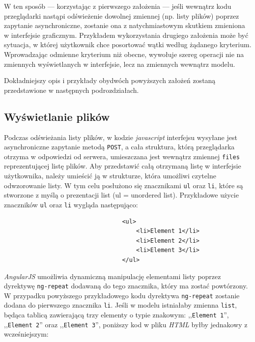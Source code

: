 \documentclass[polish,a4paper,twoside]{ppfcmthesis}
\begin{document}
W ten sposób --- korzystając z pierwszego założenia --- jeśli wewnątrz kodu przeglądarki nastąpi odświeżenie dowolnej zmiennej (np. listy plików) poprzez zapytanie asynchroniczne, zostanie ona z natychmiastowym skutkiem zmieniona w interfejsie graficznym. Przykładem wykorzystania drugiego założenia może być sytuacja, w której użytkownik chce posortować wątki według żądanego kryterium. Wprowadzając odmienne kryterium niż obecne, wywołuje szereg operacji nie na zmiennych wyświetlanych w interfejsie, lecz na zmiennych wewnątrz modelu.

Dokładniejszy opis i przykłady obydwóch powyższych założeń zostaną przedstawione w następnych podrozdziałach.

\subsection{Wyświetlanie plików}

Podczas odświeżania listy plików, w kodzie \emph{javascript} interfejsu wysyłane jest asynchroniczne zapytanie metodą \texttt{POST}, a cała struktura, którą przeglądarka otrzyma w odpowiedzi od serwera, umieszczana jest wewnątrz zmiennej \texttt{files} reprezentującej listę plików. Aby przedstawić całą otrzymaną listę w interfejsie użytkownika, należy umieścić ją w strukturze, która umożliwi czytelne odwzorowanie listy. W tym celu posłużono się znacznikami \texttt{ul} oraz \texttt{li}, które są stworzone z myślą o prezentacji list (ul = unordered list). Przykładowe użycie znaczników \texttt{ul} oraz \texttt{li} wygląda następująco:

\begin{figure}[htb]
\begin{verbatim}
                            <ul>
                                <li>Element 1</li>
                                <li>Element 2</li>
                                <li>Element 3</li>
                            </ul>
\end{verbatim}
\end{figure}

\emph{AngularJS} umożliwia dynamiczną manipulację elementami listy poprzez dyrektywę \texttt{ng-repeat} dodawaną do tego znacznika, który ma zostać powtórzony. W przypadku powyższego przykładowego kodu dyrektywa \texttt{ng-repeat} zostanie dodana do pierwszego znacznika \texttt{li}. Jeśli w modelu istniałaby zmienna \texttt{list}, będąca tablicą zawierającą trzy elementy o typie znakowym: ,,\texttt{Element 1}'', ,,\texttt{Element 2}'' oraz ,,\texttt{Element 3}'', poniższy kod w pliku \emph{HTML} byłby jednakowy z wcześniejszym:
\end{document}
